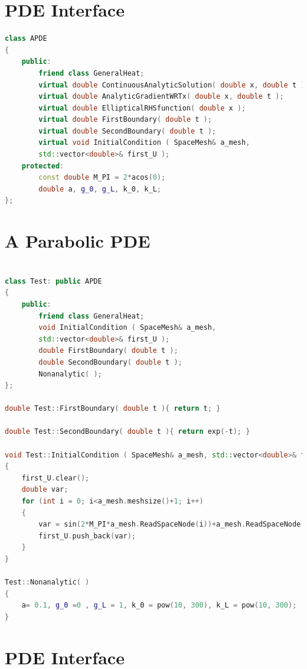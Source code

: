 \documentclass{uonmathreport}
\theoremstyle{definition}
\theoremstyle{problem}
\theoremstyle{theorem}
\begin{document}
\section{PDE Interface} \label{app:PDE Interface}

\begin{lstlisting}[language=C++]
class APDE
{
    public:
        friend class GeneralHeat;
        virtual double ContinuousAnalyticSolution( double x, double t );
        virtual double AnalyticGradientWRTx( double x, double t );
        virtual double EllipticalRHSfunction( double x );
        virtual double FirstBoundary( double t );
        virtual double SecondBoundary( double t );
        virtual void InitialCondition ( SpaceMesh& a_mesh, 
        std::vector<double>& first_U );
    protected:
        const double M_PI = 2*acos(0);
        double a, g_0, g_L, k_0, k_L;
};
\end{lstlisting}

\section{A Parabolic PDE} \label{app:PDE Interface}

\begin{lstlisting}[language=C++]

class Test: public APDE
{
    public:
        friend class GeneralHeat;
        void InitialCondition ( SpaceMesh& a_mesh, 
        std::vector<double>& first_U );
        double FirstBoundary( double t );
        double SecondBoundary( double t );
        Nonanalytic( );
};

double Test::FirstBoundary( double t ){ return t; }

double Test::SecondBoundary( double t ){ return exp(-t); }

void Test::InitialCondition ( SpaceMesh& a_mesh, std::vector<double>& first_U )
{
    first_U.clear();
    double var;
    for (int i = 0; i<a_mesh.meshsize()+1; i++)
    {
        var = sin(2*M_PI*a_mesh.ReadSpaceNode(i))+a_mesh.ReadSpaceNode(i);
        first_U.push_back(var);
    }
}

Test::Nonanalytic( )
{
    a= 0.1, g_0 =0 , g_L = 1, k_0 = pow(10, 300), k_L = pow(10, 300);
}
\end{lstlisting}

\section{PDE Interface} \label{app:PDE Interface}
\end{document}
